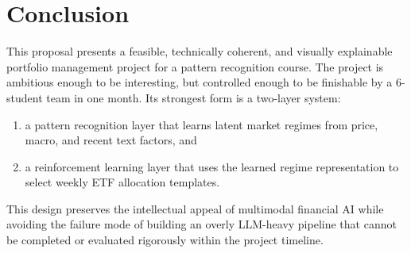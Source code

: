 \documentclass[11pt,a4paper]{article}
\begin{document}
\section{Conclusion}

This proposal presents a feasible, technically coherent, and visually explainable portfolio management project for a pattern recognition course.
The project is ambitious enough to be interesting, but controlled enough to be finishable by a 6-student team in one month.
Its strongest form is a two-layer system:

\begin{enumerate}[leftmargin=1.5em]
  \item a pattern recognition layer that learns latent market regimes from price, macro, and recent text factors, and
  \item a reinforcement learning layer that uses the learned regime representation to select weekly ETF allocation templates.
\end{enumerate}

This design preserves the intellectual appeal of multimodal financial AI while avoiding the failure mode of building an overly LLM-heavy pipeline that cannot be completed or evaluated rigorously within the project timeline.
\end{document}

